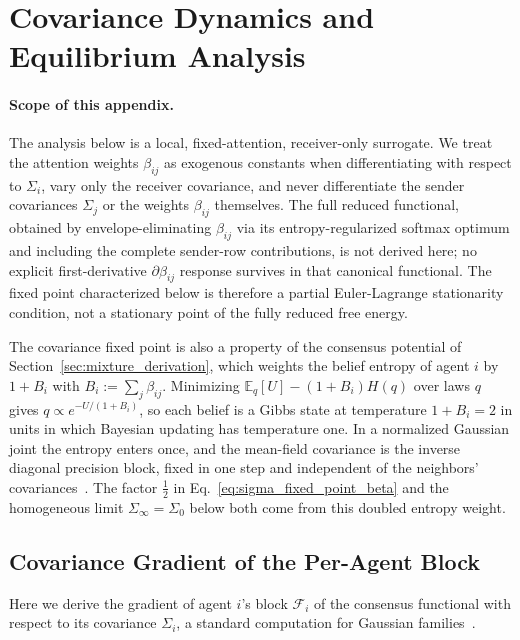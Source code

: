 \section{Covariance Dynamics and Equilibrium Analysis}
\label{app:covariance_dynamics}

\paragraph{Scope of this appendix.}
The analysis below is a local, fixed-attention, receiver-only surrogate. We treat the attention weights $\beta_{ij}$ as exogenous constants when differentiating with respect to $\Sigma_i$, vary only the receiver covariance, and never differentiate the sender covariances $\Sigma_j$ or the weights $\beta_{ij}$ themselves. The full reduced functional, obtained by envelope-eliminating $\beta_{ij}$ via its entropy-regularized softmax optimum and including the complete sender-row contributions, is not derived here; no explicit first-derivative $\partial\beta_{ij}$ response survives in that canonical functional. The fixed point characterized below is therefore a partial Euler-Lagrange stationarity condition, not a stationary point of the fully reduced free energy.

The covariance fixed point is also a property of the consensus potential of Section~\ref{sec:mixture_derivation}, which weights the belief entropy of agent $i$ by $1+B_i$ with $B_i := \sum_j\beta_{ij}$. Minimizing $\mathbb{E}_{q}[U] - (1+B_i)H(q)$ over laws $q$ gives $q \propto e^{-U/(1+B_i)}$, so each belief is a Gibbs state at temperature $1+B_i = 2$ in units in which Bayesian updating has temperature one. In a normalized Gaussian joint the entropy enters once, and the mean-field covariance is the inverse diagonal precision block, fixed in one step and independent of the neighbors' covariances~\cite[Ch.~G4, block optimum]{DennisGaugeVFESuppG2026}. The factor $\tfrac{1}{2}$ in Eq.~\eqref{eq:sigma_fixed_point_beta} and the homogeneous limit $\Sigma_\infty = \Sigma_0$ below both come from this doubled entropy weight.

\subsection{Covariance Gradient of the Per-Agent Block}

Here we derive the gradient of agent $i$'s block $\mathcal{F}_i$ of the consensus functional with respect to its covariance $\Sigma_i$, a standard computation for Gaussian families~\cite{Amari2016, petersen2012matrix}.

